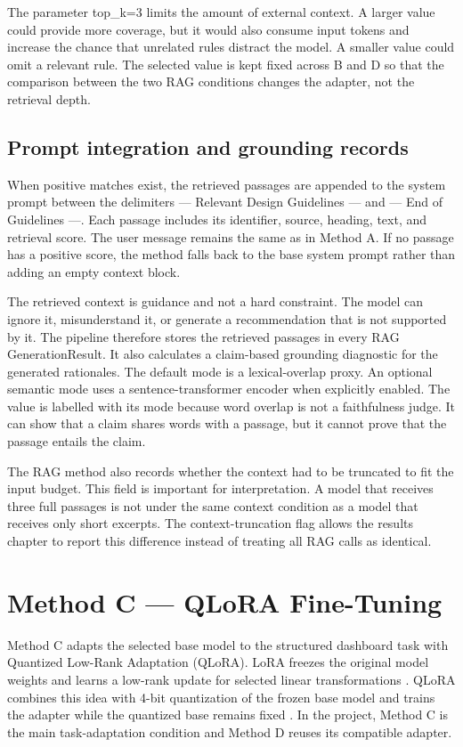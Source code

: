 The parameter top\_k=3 limits the amount of external context. A larger value could provide more coverage, but it would also consume input tokens and increase the chance that unrelated rules distract the model. A smaller value could omit a relevant rule. The selected value is kept fixed across B and D so that the comparison between the two RAG conditions changes the adapter, not the retrieval depth.

\subsection{Prompt integration and grounding records}

When positive matches exist, the retrieved passages are appended to the system prompt between the delimiters --- Relevant Design Guidelines --- and --- End of Guidelines ---. Each passage includes its identifier, source, heading, text, and retrieval score. The user message remains the same as in Method A. If no passage has a positive score, the method falls back to the base system prompt rather than adding an empty context block.

The retrieved context is guidance and not a hard constraint. The model can ignore it, misunderstand it, or generate a recommendation that is not supported by it. The pipeline therefore stores the retrieved passages in every RAG GenerationResult. It also calculates a claim-based grounding diagnostic for the generated rationales. The default mode is a lexical-overlap proxy. An optional semantic mode uses a sentence-transformer encoder when explicitly enabled. The value is labelled with its mode because word overlap is not a faithfulness judge. It can show that a claim shares words with a passage, but it cannot prove that the passage entails the claim.

The RAG method also records whether the context had to be truncated to fit the input budget. This field is important for interpretation. A model that receives three full passages is not under the same context condition as a model that receives only short excerpts. The context-truncation flag allows the results chapter to report this difference instead of treating all RAG calls as identical.

\section{Method C --- QLoRA Fine-Tuning}

Method C adapts the selected base model to the structured dashboard task with Quantized Low-Rank Adaptation (QLoRA). LoRA freezes the original model weights and learns a low-rank update for selected linear transformations \cite{hu2022lora}. QLoRA combines this idea with 4-bit quantization of the frozen base model and trains the adapter while the quantized base remains fixed \cite{dettmers2023qlora}. In the project, Method C is the main task-adaptation condition and Method D reuses its compatible adapter.

